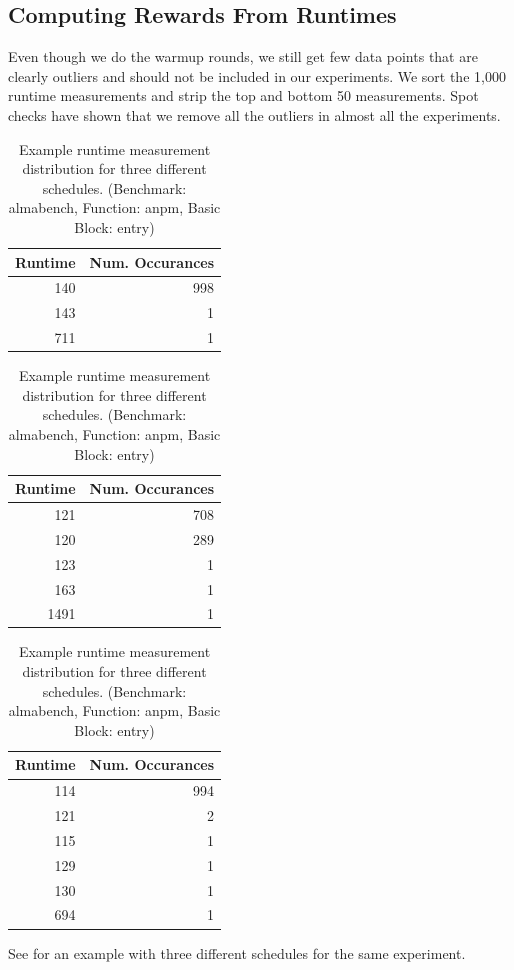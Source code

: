 \subsection{Computing Rewards From Runtimes}
\tobechecked
Even though we do the warmup rounds, we still get few data points that are clearly outliers and should not be included in our experiments.
We sort the 1,000 runtime measurements and strip the top and bottom 50 measurements.
Spot checks have shown that we remove all the outliers in almost all the experiments.
\begin{table}
    \centering
    \begin{tabular}{@{}rr@{}}
        \toprule
        Runtime & Num. Occurances \\
        \midrule
        140 & 998 \\
        143 & 1 \\
        711 & 1 \\
        \bottomrule
    \end{tabular}
    \hspace{0.8cm}
    \begin{tabular}{@{}rr@{}}
        \toprule
        Runtime & Num. Occurances \\
        \midrule
        121 & 708 \\
        120 & 289 \\
        123 & 1 \\
        163 & 1 \\
        1491 & 1 \\
        \bottomrule
    \end{tabular}
    \hspace{0.8cm}
    \begin{tabular}{@{}rr@{}}
        \toprule
        Runtime & Num. Occurances \\
        \midrule
        114 & 994 \\
        121 & 2 \\
        115 & 1 \\
        129 & 1 \\
        130 & 1 \\
        694 & 1 \\
        \bottomrule
    \end{tabular}
    \caption[Example runtime measurement distribution]{Example runtime measurement distribution for three different schedules. (Benchmark: almabench, Function: anpm, Basic Block: entry)}
    \label{tab:approach:example_runtimes}
\end{table}
See  for an example with three different schedules for the same experiment.

